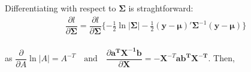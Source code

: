 \documentclass[useAMS,referee]{biom}
\begin{document}
Differentiating with respect to $\boldsymbol{\Sigma}$ is straghtforward:
\begin{equation}
\begin{array}{l}
\dfrac{\partial l}{\partial \boldsymbol{\Sigma}} =\dfrac{\partial l}{\partial \boldsymbol{\Sigma}} \{-\frac{1}{2}\ln |\boldsymbol{\Sigma}| - \frac{1}{2} (\mathbf{y}-\boldsymbol{\mu})'\boldsymbol{\Sigma}^{-1} (\mathbf{y}-\boldsymbol{\mu})\}




\end{array}
\end{equation}\\
as $\dfrac{\partial}{\partial A} \ln|A| = A^{-T} \quad \mbox{and} \quad \dfrac{\partial \mathbf{a^{T} X^{-1} b}}{\partial \mathbf{X}}  = -\mathbf{X}^{-T} \mathbf{ab^{T} X ^{-T}}$. Then, 
\end{document}
